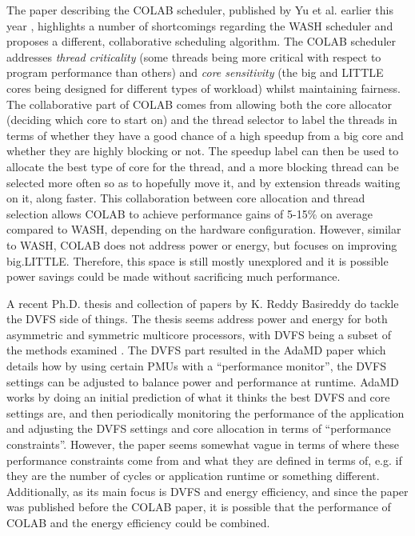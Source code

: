 The paper describing the COLAB scheduler, published by Yu et al. earlier this
year \cite{yu_colab_2020}, highlights a number of shortcomings regarding the
WASH scheduler and proposes a different, collaborative scheduling algorithm. The
COLAB scheduler addresses \textit{thread criticality} (some threads being more
critical with respect to program performance than others) and
\textit{core sensitivity} (the big and LITTLE cores being designed for different
types of workload) whilst maintaining fairness. The collaborative part of COLAB
comes from allowing both the core allocator (deciding which core to start on)
and the thread selector to label the threads in terms of whether they have a
good chance of a high speedup from a big core and whether they are highly
blocking or not. The speedup label can then be used to allocate the best type of
core for the thread, and a more blocking thread can be selected more often so as
to hopefully move it, and by extension threads waiting on it, along faster. This
collaboration between core allocation and thread selection allows COLAB to
achieve performance gains of 5-15\% on average compared to WASH, depending on
the hardware configuration. However, similar to WASH, COLAB does not address
power or energy, but focuses on improving big.LITTLE. Therefore, this space is
still mostly unexplored and it is possible power savings could be made without
sacrificing much performance.

A recent Ph.D. thesis and collection of papers by K. Reddy Basireddy do tackle
the DVFS side of things. The thesis seems address power and energy for both
asymmetric and symmetric multicore processors, with DVFS being a subset of the
methods examined \cite{basireddy_runtime_2019}. The DVFS part resulted in the
AdaMD paper \cite{basireddy_adamd_2019} which details how by using certain PMUs
with a ``performance monitor'', the DVFS settings can be adjusted to balance
power and performance at runtime. AdaMD works by doing an initial prediction of
what it thinks the best DVFS and core settings are, and then periodically
monitoring the performance of the application and adjusting the DVFS settings
and core allocation in terms of ``performance constraints''. However, the paper
seems somewhat vague in terms of where these performance constraints come from
and what they are defined in terms of, e.g. if they are the number of cycles or
application runtime or something different. Additionally, as its main focus is
DVFS and energy efficiency, and since the paper was published before the COLAB
paper, it is possible that the performance of COLAB and the energy efficiency
could be combined.

